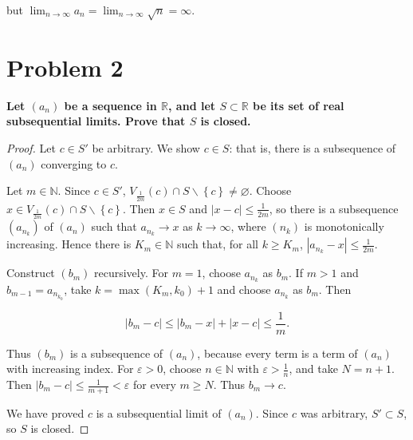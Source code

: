 but \(\lim_{n\rightarrow\infty}a_{n} = \lim_{n\rightarrow\infty}\sqrt{n} = \infty\).

\section{Problem 2}

\textbf{Let \(\left( a_{n} \right)\) be a sequence in \(\mathbb{R}\), and let \(S \subset \mathbb{R}\) be its set of real subsequential limits. Prove that \(S\) is closed.}

\begin{proof}

Let \(c \in S'\) be arbitrary. We show \(c \in S\): that is, there is a subsequence of \(\left( a_{n} \right)\) converging to \(c\).

Let \(m \in \mathbb{N}\). Since \(c \in S'\), \(V_{\frac{1}{2m}}(c) \cap S \smallsetminus \left\{ c \right\} \neq \varnothing\). Choose \(x \in V_{\frac{1}{2m}}(c) \cap S \smallsetminus \left\{ c \right\}\). Then \(x \in S\) and \(\left| {x - c} \right| \leq \frac{1}{2m}\), so there is a subsequence \(\left( a_{n_{k}} \right)\) of \(\left( a_{n} \right)\) such that \(a_{n_{k}}\rightarrow x\) as \(k\rightarrow\infty\), where \(\left( n_{k} \right)\) is monotonically increasing. Hence there is \(K_{m} \in \mathbb{N}\) such that, for all \(k \geq K_{m}\), \(\left| {a_{n_{k}} - x} \right| \leq \frac{1}{2m}\).

Construct \(\left( b_{m} \right)\) recursively. For \(m = 1\), choose \(a_{n_{k}}\) as \(b_{m}\). If \(m > 1\) and \(b_{m - 1} = a_{n_{k_{0}}}\), take \(k = \max\left( {K_{m},k_{0}} \right) + 1\) and choose \(a_{n_{k}}\) as \(b_{m}\). Then

\[\left| {b_{m} - c} \right| \leq \left| {b_{m} - x} \right| + \left| {x - c} \right| \leq \frac{1}{m}.\]

Thus \(\left( b_{m} \right)\) is a subsequence of \(\left( a_{n} \right)\), because every term is a term of \(\left( a_{n} \right)\) with increasing index. For \(\varepsilon > 0\), choose \(n \in \mathbb{N}\) with \(\varepsilon > \frac{1}{n}\), and take \(N = n + 1\). Then \(\left| {b_{m} - c} \right| \leq \frac{1}{m + 1} < \varepsilon\) for every \(m \geq N\). Thus \(b_{m}\rightarrow c\).

We have proved \(c\) is a subsequential limit of \(\left( a_{n} \right)\). Since \(c\) was arbitrary, \(S' \subset S\), so \(S\) is closed.

\end{proof}

